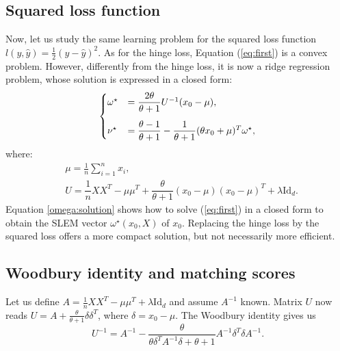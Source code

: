 \subsection{Squared loss function}\label{SLEM}
Now, let us study the same learning problem for the squared loss function $l(y,\hat{y}) = \frac{1}{2}(y-\hat{y})^2$. As for the hinge loss, Equation (\ref{eq:first}) is a convex problem. 
However, differently from the hinge loss, it is now a ridge regression problem, whose solution is expressed in a closed form:
\begin{align}
\begin{cases}
\vspace{3 mm}
\omega^\star &= \dfrac{2\theta}{\theta+1}U^{-1}(x_0-\mu), \\
\nu^\star &= \dfrac{\theta-1}{\theta+1}-\dfrac{1}{\theta+1}(\theta x_0+\mu)^T\omega^\star,
\end{cases}
\label{omega:solution}
\end{align}
where:
\begin{align}
&\mu = \frac{1}{n}\sum_{i=1}^n x_i,\\
&U = \dfrac{1}{n}XX^T-\mu\mu^T+\dfrac{\theta}{\theta+1}(x_0-\mu)(x_0-\mu)^T+\lambda\mathrm{Id}_d. \label{eq:U}
\end{align}
Equation \ref{omega:solution} shows how to solve (\ref{eq:first}) in a closed form to obtain the SLEM vector $\omega^\star(x_0,X)$ of $x_0$. 
Replacing the hinge loss by the squared loss offers a more compact solution, but not necessarily more efficient.

\subsection{Woodbury identity and matching scores}
Let us define $A = \frac{1}{n}XX^T-\mu\mu^T +\lambda\mathrm{Id}_d$ and assume $A^{-1}$ known. 
Matrix $U$ now reads $U = A + \frac{\theta}{\theta+1}\delta\delta^T$, where $\delta=x_0-\mu$. The Woodbury identity \cite{woodbury} gives us
\begin{equation}
U^{-1} = A^{-1} -\dfrac{\theta}{\theta\delta^TA^{-1}\delta+ \theta+1}A^{-1}\delta^T\delta A^{-1}. \label{invU}
\end{equation}

